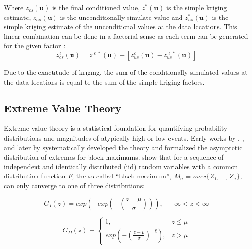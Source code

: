 Where $z_{cs}(\mathbf{u})$ is the final conditioned value, $z^{*}(\mathbf{u})$ is the simple kriging estimate, $z_{us}(\mathbf{u})$ is the unconditionally simulate value and $z_{us}^{*}(\mathbf{u})$ is the simple kriging estimate of the unconditional values at the data locations. This linear combination can be done in a factorial sense as each term can be generated for the given factor \citep{hong2007improved}:
\begin{equation*}
    z_{cs}^{\ell}(\mathbf{u}) = z^{\ell*}(\mathbf{u}) + [z_{us}^{\ell}(\mathbf{u}) - z_{us}^{\ell*}(\mathbf{u})]
\end{equation*}

Due to the exactitude of kriging, the sum of the conditionally simulated values at the data locations is equal to the sum of the simple kriging factors.

\subsection{Extreme Value Theory}
\label{subsec:01evt}

Extreme value theory is a statistical foundation for quantifying probability distributions and magnitudes of atypically high or low events. Early works by \cite{frechet1927loi}, \cite{fisher1928limiting}, \cite{mises1936distribution} and later by \cite{gnedenko1943distribution}  systematically developed the theory and formalized the asymptotic distribution of extremes for block maximums. \cite{fisher1928limiting} show that for a sequence of independent and identically distributed (iid) random variables with a common distribution function $F$, the so-called ``block maximum'', $M_n = max\{Z_1,...,Z_n\}$, can only converge to one of three distributions:

\begin{equation}
    G_{I}(z) = exp\left(-exp\left(-\left(\frac{z-\mu}{\sigma}\right)\right)\right), \ \ -\infty < z < \infty
    \label{eq:1}
\end{equation}

\begin{equation}
    G_{II}(z) =
    \begin{cases}
        0,                                                           & z \leq \mu \\
        exp\left(-\left( \frac{z-\mu}{\sigma} \right)^{-\xi}\right), & z > \mu
    \end{cases}
    \label{eq:2}
\end{equation}

